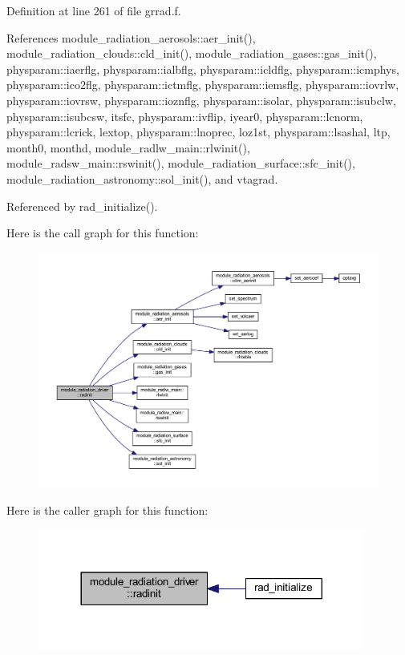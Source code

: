 Definition at line 261 of file grrad.\+f.



References module\+\_\+radiation\+\_\+aerosols\+::aer\+\_\+init(), module\+\_\+radiation\+\_\+clouds\+::cld\+\_\+init(), module\+\_\+radiation\+\_\+gases\+::gas\+\_\+init(), physparam\+::iaerflg, physparam\+::ialbflg, physparam\+::icldflg, physparam\+::icmphys, physparam\+::ico2flg, physparam\+::ictmflg, physparam\+::iemsflg, physparam\+::iovrlw, physparam\+::iovrsw, physparam\+::ioznflg, physparam\+::isolar, physparam\+::isubclw, physparam\+::isubcsw, itsfc, physparam\+::ivflip, iyear0, physparam\+::lcnorm, physparam\+::lcrick, lextop, physparam\+::lnoprec, loz1st, physparam\+::lsashal, ltp, month0, monthd, module\+\_\+radlw\+\_\+main\+::rlwinit(), module\+\_\+radsw\+\_\+main\+::rswinit(), module\+\_\+radiation\+\_\+surface\+::sfc\+\_\+init(), module\+\_\+radiation\+\_\+astronomy\+::sol\+\_\+init(), and vtagrad.



Referenced by rad\+\_\+initialize().



Here is the call graph for this function\+:
\nopagebreak
\begin{figure}[H]
\begin{center}
\leavevmode
\includegraphics[width=350pt]{namespacemodule__radiation__driver_af039e0c23dc6ab8d2f8b1c1c796ac0da_cgraph}
\end{center}
\end{figure}




Here is the caller graph for this function\+:
\nopagebreak
\begin{figure}[H]
\begin{center}
\leavevmode
\includegraphics[width=305pt]{namespacemodule__radiation__driver_af039e0c23dc6ab8d2f8b1c1c796ac0da_icgraph}
\end{center}
\end{figure}


